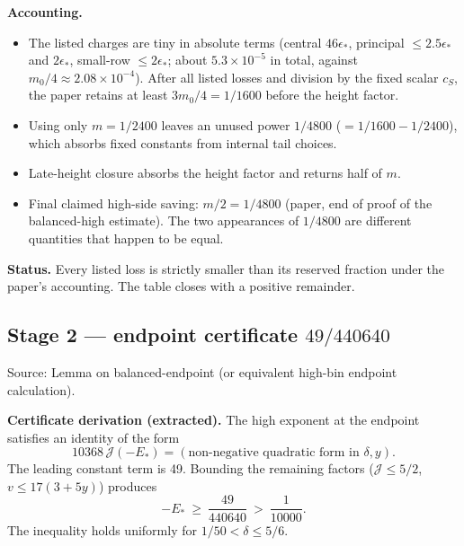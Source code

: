\documentclass[11pt]{article}
\begin{document}
\textbf{Accounting.}
\begin{itemize}[leftmargin=1.4em,itemsep=0.2em]
\item The listed charges are tiny in absolute terms (central $46\epsilon_*$, principal $\le2.5\epsilon_*$ and $2\epsilon_*$, small-row $\le2\epsilon_*$; about $5.3\times10^{-5}$ in total, against $m_0/4\approx2.08\times10^{-4}$). After all listed losses and division by the fixed scalar $c_S$, the paper retains at least $3m_0/4=1/1600$ before the height factor.
\item Using only $m=1/2400$ leaves an unused power $1/4800$ ($=1/1600-1/2400$), which absorbs fixed constants from internal tail choices.
\item Late-height closure absorbs the height factor and returns half of $m$.
\item Final claimed high-side saving: $m/2=1/4800$ (paper, end of proof of the balanced-high estimate). The two appearances of $1/4800$ are different quantities that happen to be equal.
\end{itemize}
\textbf{Status.} Every listed loss is strictly smaller than its reserved fraction under the paper's accounting. The table closes with a positive remainder.

\subsection{Stage 2 --- endpoint certificate $49/440640$}
Source: Lemma on balanced-endpoint (or equivalent high-bin endpoint calculation).

\textbf{Certificate derivation (extracted).} The high exponent at the endpoint satisfies an identity of the form
\[10368\,\mathcal{J}(-E_*) = (\text{non-negative quadratic form in } \delta, y).\]
The leading constant term is 49. Bounding the remaining factors ($\mathcal{J}\le5/2$, $v\le17(3+5y)$) produces
\[-E_*\ \ge\ \frac{49}{440640}\ >\ \frac{1}{10000}.\]
The inequality holds uniformly for $1/50<\delta\le5/6$.
\end{document}
